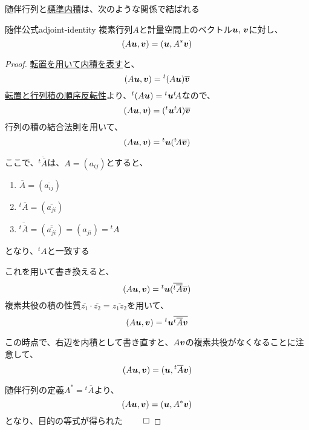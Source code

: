 \documentclass[../../../topic_linear-algebra]{subfiles}
\begin{document}
随伴行列と\hyperref[def:standard-inner-product-Cn]{標準内積}は、次のような関係で結ばれる

\begin{theorem}{随伴公式}{adjoint-identity}
  複素行列$A$と計量空間上のベクトル$\vb*{u},\,\vb*{v}$に対し、
  \begin{equation*}
    (A\vb*{u}, \vb*{v}) = (\vb*{u}, A^*\vb*{v})
  \end{equation*}
\end{theorem}

\begin{proof}
  \hyperref[thm:inner-product-as-transpose-product]{転置を用いて内積を表す}と、
  \begin{equation*}
    (A\vb*{u},\vb*{v}) = {}^t(A\vb*{u}) \overline{\vb*{v}}
  \end{equation*}
  \hyperref[thm:transpose-of-product]{転置と行列積の順序反転性}より、${}^t(A\vb*{u}) = {}^t\vb*{u} {}^t\! A$なので、
  \begin{equation*}
    (A\vb*{u},\vb*{v}) = ({}^t\vb*{u} {}^t\! A) \overline{\vb*{v}}
  \end{equation*}
  行列の積の結合法則を用いて、
  \begin{equation*}
    (A\vb*{u},\vb*{v}) = {}^t\vb*{u} ({}^t\! A\overline{\vb*{v}})
  \end{equation*}

  ここで、$\overline{{}^t \overline{A}}$は、$A=(a_{ij})$とすると、
  \begin{enumerate}
    \item $\overline{A} = (\overline{a_{ij}})$
    \item ${}^t\overline{A} = (\overline{a_{ji}})$
    \item $\overline{{}^t\overline{A}} = (\overline{\overline{a_{ji}}}) = (a_{ji}) = {}^t A$
  \end{enumerate}
  となり、${}^t A$と一致する

  これを用いて書き換えると、
  \begin{equation*}
    (A\vb*{u},\vb*{v}) = {}^t\vb*{u} (\overline{{}^t \overline{A}} \overline{\vb*{v}})
  \end{equation*}
  複素共役の積の性質$\overline{z_1} \cdot \overline{z_2} = \overline{z_1 z_2}$を用いて、
  \begin{equation*}
    (A\vb*{u},\vb*{v}) = {}^t\vb*{u} \overline{{}^t \overline{A} \vb*{v}}
  \end{equation*}

  この時点で、右辺を内積として書き直すと、$A\vb*{v}$の複素共役がなくなることに注意して、
  \begin{equation*}
    (A\vb*{u},\vb*{v}) = (\vb*{u}, {}^t \overline{A} \vb*{v})
  \end{equation*}

  随伴行列の定義$A^* = {}^t \overline{A}$より、
  \begin{equation*}
    (A\vb*{u},\vb*{v}) = (\vb*{u}, A^* \vb*{v})
  \end{equation*}
  となり、目的の等式が得られた $\qed$
\end{proof}
\end{document}
